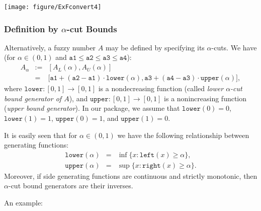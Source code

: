 \documentclass[11pt]{article}\usepackage[]{graphicx}\usepackage[]{color}
\newenvironment{knitrout}{}{} %
\begin{document}
\begin{center}
\begin{knitrout}\small
{}\color{fgcolor}

{\centering \texttt{[image: figure/ExFconvert4]} 

}



\end{knitrout}
\end{center}



\subsubsection{Definition by $\alpha$-cut Bounds}

Alternatively, a fuzzy number $A$ may be defined by specifying
its $\alpha$-cuts. We have (for $\alpha\in(0,1)$ and
$\mathtt{a1}\le\mathtt{a2}\le\mathtt{a3}\le\mathtt{a4}$):
\begin{eqnarray}
A_\alpha & := & [A_L(\alpha), A_U(\alpha)]\\
 & = & \big[
   \mathtt{a1}+(\mathtt{a2}-\mathtt{a1})\cdot\mathtt{lower}(\alpha),
   \mathtt{a3}+(\mathtt{a4}-\mathtt{a3})\cdot\mathtt{upper}(\alpha)
\big],
\end{eqnarray}
where $\mathtt{lower}: [0,1]\to[0,1]$ is a nondecreasing function
(called \textit{lower $\alpha$-cut bound generator of $A$}),
and $\mathtt{upper}: [0,1]\to[0,1]$ is a nonincreasing function
(\textit{upper bound generator}).
In our package, we assume that
$\mathtt{lower}(0)=0$, $\mathtt{lower}(1)=1$,
$\mathtt{upper}(0)=1$, and $\mathtt{upper}(1)=0$.

It is easily seen that for $\alpha\in(0,1)$ we have the following
relationship between generating functions:
\begin{eqnarray}
\mathtt{lower}(\alpha) & = & \inf\{x: \mathtt{left}(x)\ge\alpha\}, \\
\mathtt{upper}(\alpha) & = & \sup\{x: \mathtt{right}(x)\ge\alpha\}.
\end{eqnarray}
Moreover, if side generating functions are continuous and strictly
monotonic, then $\alpha$-cut bound generators are their inverses.

\bigskip\noindent
An example:
\end{document}
